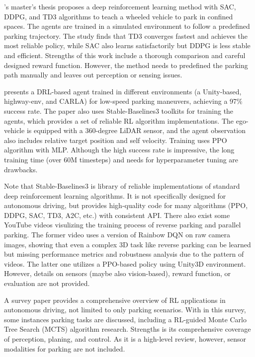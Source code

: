 \documentclass{article}
\begin{document}
\citet{moreira2021deep}'s master's thesis proposes a deep reinforcement learning method with SAC, DDPG, and TD3 algorithms to teach a wheeled vehicle to park in confined spaces. The agents are trained in a simulated environment to follow a predefined parking trajectory. The study finds that TD3 converges fastest and achieves the most reliable policy, while SAC also learns satisfactorily but DDPG is less stable and efficient. Strengths of this work include a thorough comparison and careful designed reward function. However, the method needs to predefined the parking path manually and leaves out perception or sensing issues.

\citet{lazzaroni2023automated} presents a DRL-based agent trained in different environments (a Unity-based, highway-env, and CARLA) for low-speed parking maneuvers, achieving a 97\% success rate. The paper also uses Stable-Baselines3 \cite{stable-baselines3} toolkits for training the agents, which provides a set of reliable RL algorithm implementations. The ego-vehicle is equipped with a 360-degree LiDAR sensor, and the agent observation also includes relative target position and self velocity. Training uses PPO algorithm with MLP. Although the high success rate is impressive, the long training time (over 60M timesteps) and needs for hyperparameter tuning are drawbacks.

Note that Stable-Baselines3 \cite{stable-baselines3} is library of reliable implementations of standard deep reinforcement learning algorithms. It is not specifically designed for autonomous driving, but provides high-quality code for many algorithms (PPO, DDPG, SAC, TD3, A2C, etc.) with consistent API. There also exist some YouTube videos \citep{youtube2019,youtube2022} visulizing the training process of reverse parking and parallel parking. The former video uses a version of Rainbow DQN on raw camera images, showing that even a complex 3D task like reverse parking can be learned but missing performance metrics and robustness analysis due to the pattern of videos. The latter one utilizes a PPO-based policy using Unity3D environment. However, details on sensors (maybe also vision-based), reward function, or evaluation are not provided.

A survey paper \cite{elallid2022comprehensive} provides a comprehensive overview of RL applications in autonomous driving, not limited to only parking scenarios. With in this survey, some instances parking tasks are discussed, including a RL-guided Monte Carlo Tree Search (MCTS) algorithm research. Strengths is its comprehensive coverage of perception, planing, and control. As it is a high-level review, however, sensor modalities for parking are not included.
\end{document}
